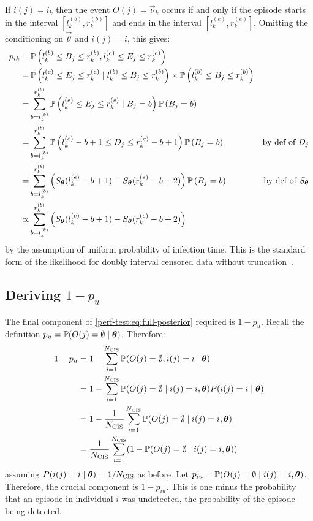 \documentclass[thesis.tex]{subfiles}
\begin{document}
If $i(j) = i_k$ then the event $O(j) = \vec{\nu}_k$ occurs if and only if the episode starts in the interval $[l^{(b)}_k, r^{(b)}_k]$ and ends in the interval $[l^{(e)}_k, r^{(e)}_k]$.
Omitting the conditioning on $\vec{\theta}$ and $i(j) = i$, this gives:
\begin{align}
p_{ik}
=& \operatorname{\mathbb{P}} \left( l_k^{(b)} \leq B_{j} \leq r_k^{(b)}, l_k^{(e)} \leq E_{j} \leq r_k^{(e)} \right) \\
=& \operatorname{\mathbb{P}} \left( l_k^{(e)} \leq E_{j} \leq r_k^{(e)} \mid l_k^{(b)} \leq B_{j} \leq r_k^{(b)} \right) \times\operatorname{\mathbb{P}} \left( l_k^{(b)} \leq B_{j} \leq r_k^{(b)} \right) \\
=& \sum_{b = l_k^{(b)}}^{r_k^{(b)}} \operatorname{\mathbb{P}} \left( l_k^{(e)} \leq E_{j} \leq r_k^{(e)} \mid B_{j} = b \right) \operatorname{\mathbb{P}} \left(B_{j} = b \right) \\
=& \sum_{b = l_k^{(b)}}^{r_k^{(b)}} \operatorname{\mathbb{P}} \left( l_k^{(e)} - b + 1 \leq D_{j} \leq r_k^{(e)} - b + 1 \right) \operatorname{\mathbb{P}} \left(B_{j} = b \right) &\text{by def of $D_{j}$} \\
=& \sum_{b = l_k^{(b)}}^{r_k^{(b)}} \left( S_{\bm{\theta}}(l_k^{(e)} - b + 1) - S_{\bm{\theta}}(r_k^{(e)} - b + 2) \right) \operatorname{\mathbb{P}} \left(B_{j} = b \right) &\text{by def of $S_{\bm{\theta}}$} \\
\propto& \sum_{b = l_k^{(b)}}^{r_k^{(b)}} \left( S_{\bm{\theta}}(l_k^{(e)} - b + 1) - S_{\bm{\theta}}(r_k^{(e)} - b + 2) \right)
\label{perf-test:eq:pia}
\end{align}
by the assumption of uniform probability of infection time.
This is the standard form of the likelihood for doubly interval censored data without truncation~\autocite[e.g.][]{sunEmpirical}.

\subsection{Deriving $1 - p_u$} \label{perf-test:sec:prob-undetected}

The final component of \cref{perf-test:eq:full-posterior} required is $1 - p_u$.
Recall the definition $p_u = \operatorname{\mathbb{P}}(O(j) = \emptyset \mid \bm{\theta})$.
Therefore:
\begin{align}
  1 - p_u
  &= 1 - \sum_{i=1}^{N_\text{CIS}} \operatorname{\mathbb{P}}(O(j) = \emptyset, i(j) = i \mid \bm{\theta}) \\
  &= 1 - \sum_{i=1}^{N_\text{CIS}} \operatorname{\mathbb{P}}(O(j) = \emptyset \mid i(j) = i, \bm{\theta}) P(i(j) = i \mid \bm{\theta}) \\
  &= 1 - \frac{1}{N_\text{CIS}}\sum_{i=1}^{N_\text{CIS}} \operatorname{\mathbb{P}}(O(j) = \emptyset \mid i(j) = i, \bm{\theta}) \\
  &= \frac{1}{N_\text{CIS}} \sum_{i=1}^{N_\text{CIS}} (1 - \operatorname{\mathbb{P}}(O(j) = \emptyset \mid i(j) = i, \bm{\theta}))
  \label{perf-test:eq:pu}
\end{align}
assuming $P(i(j) = i \mid \bm{\theta}) = 1/N_\text{CIS}$ as before.
Let $p_{iu} = \operatorname{\mathbb{P}}(O(j) = \emptyset \mid i(j) = i, \bm{\theta})$.
Therefore, the crucial component is $1 - p_{iu}$.
This is one minus the probability that an episode in individual $i$ was undetected, \ie the probability of the episode being detected.
\end{document}
